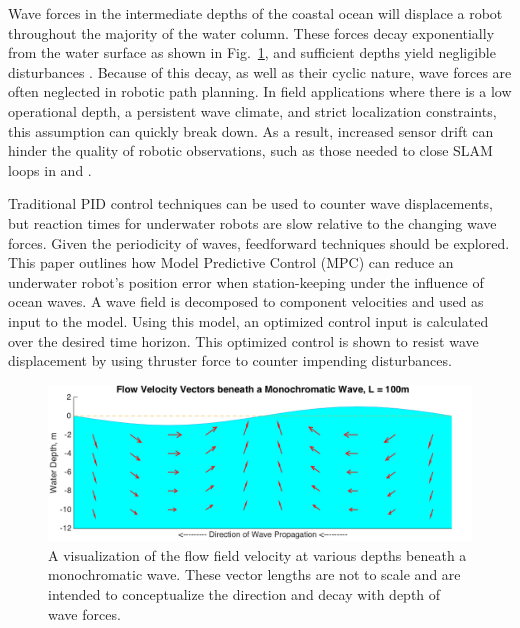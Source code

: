\documentclass[letterpaper, 10 pt, conferences]{IEEEconf}  %
\begin{document}
Wave forces in the intermediate depths of the coastal ocean will displace a robot throughout the majority of the water column. These forces decay exponentially from the water surface as shown in Fig.~\ref{fig:flowFig}, and sufficient depths yield negligible disturbances \cite{D&D}. Because of this decay, as well as their cyclic nature, wave forces are often neglected in robotic path planning. In field applications where there is a low operational depth, a persistent wave climate, and strict localization constraints, this assumption can quickly break down. As a result, increased sensor drift can hinder the quality of robotic observations, such as those needed to close SLAM loops in \cite{kim} and \cite{chaves}.
 
Traditional PID control techniques can be used to counter wave displacements, but reaction times for underwater robots are slow relative to the changing wave forces. Given the periodicity of waves, feedforward techniques should be explored. This paper outlines how Model Predictive Control (MPC) can reduce an underwater robot's position error when station-keeping under the influence of ocean waves. A wave field is decomposed to component velocities and used as input to the model. Using this model, an optimized control input is calculated over the desired time horizon. This optimized control is shown to resist wave displacement by using thruster force to counter impending disturbances.

\begin{figure}
\includegraphics[width=1\columnwidth]{images/flowFig}
\vspace*{-16pt}
\centering
\caption{A visualization of the flow field velocity at various depths beneath a monochromatic wave. These vector lengths are not to scale and are intended to conceptualize the direction and decay with depth of wave forces.}
\centering
\label{fig:flowFig}
\end{figure}
\end{document}
